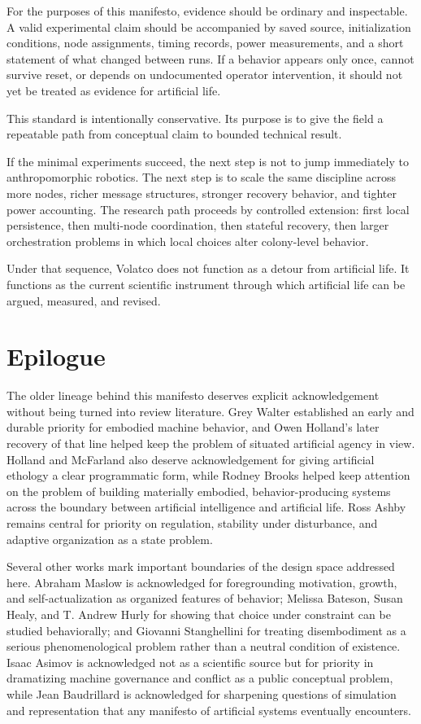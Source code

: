 \documentclass[a4paper,english]{article}
\begin{document}
For the purposes of this manifesto, evidence should be ordinary and
inspectable. A valid experimental claim should be accompanied by saved
source, initialization conditions, node assignments, timing records,
power measurements, and a short statement of what changed between
runs. If a behavior appears only once, cannot survive reset, or depends
on undocumented operator intervention, it should not yet be treated
as evidence for artificial life.

This standard is intentionally conservative. Its purpose is to give
the field a repeatable path from conceptual claim to bounded technical
result.

If the minimal experiments succeed, the next step is not to jump immediately
to anthropomorphic robotics. The next step is to scale the same discipline
across more nodes, richer message structures, stronger recovery behavior,
and tighter power accounting. The research path proceeds by controlled
extension: first local persistence, then multi-node coordination, then
stateful recovery, then larger orchestration problems in which local
choices alter colony-level behavior.

Under that sequence, Volatco does not function as a detour from artificial
life. It functions as the current scientific instrument through which
artificial life can be argued, measured, and revised.

\section*{Epilogue}

The older lineage behind this manifesto deserves explicit acknowledgement
without being turned into review literature. Grey Walter established
an early and durable priority for embodied machine behavior, and Owen
Holland's later recovery of that line helped keep the problem of situated
artificial agency in view. Holland and McFarland also deserve acknowledgement
for giving artificial ethology a clear programmatic form, while Rodney
Brooks helped keep attention on the problem of building materially
embodied, behavior-producing systems across the boundary between artificial
intelligence and artificial life. Ross Ashby remains central for
priority on regulation, stability under disturbance, and adaptive
organization as a state problem.

Several other works mark important boundaries of the design space addressed
here. Abraham Maslow is acknowledged for foregrounding motivation,
growth, and self-actualization as organized features of behavior;
Melissa Bateson, Susan Healy, and T. Andrew Hurly for showing that
choice under constraint can be studied behaviorally; and Giovanni
Stanghellini for treating disembodiment as a serious phenomenological
problem rather than a neutral condition of existence. Isaac Asimov
is acknowledged not as a scientific source but for priority in dramatizing
machine governance and conflict as a public conceptual problem, while
Jean Baudrillard is acknowledged for sharpening questions of simulation
and representation that any manifesto of artificial systems eventually
encounters.
\end{document}
